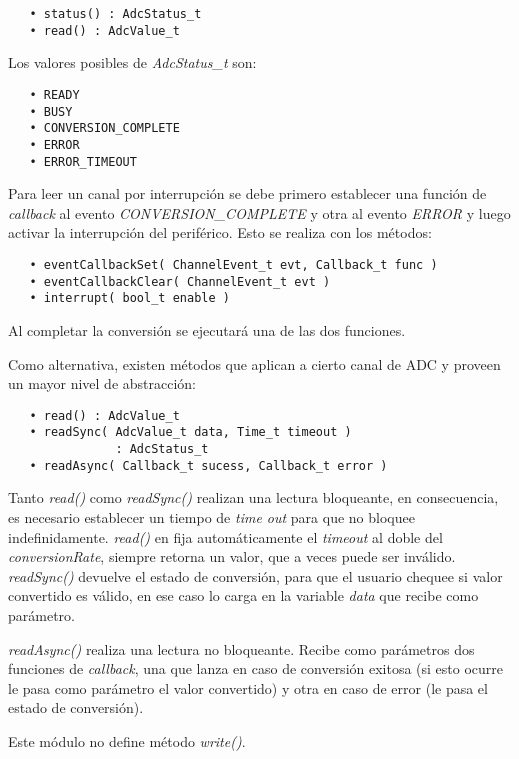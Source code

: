 \begin{verbatim}
   • status() : AdcStatus_t
   • read() : AdcValue_t
\end{verbatim}

Los valores posibles de \emph{AdcStatus\_t} son: 


\begin{verbatim}
   • READY
   • BUSY
   • CONVERSION_COMPLETE
   • ERROR
   • ERROR_TIMEOUT
\end{verbatim}

Para leer un canal por interrupción se debe primero establecer una función de \emph{callback} al evento \emph{CONVERSION\_COMPLETE} y otra al evento  \emph{ERROR} y luego activar la interrupción del periférico. Esto se realiza con los métodos:

\begin{verbatim}
   • eventCallbackSet( ChannelEvent_t evt, Callback_t func )
   • eventCallbackClear( ChannelEvent_t evt )
   • interrupt( bool_t enable )
\end{verbatim}

Al completar la conversión se ejecutará una de las dos funciones.


Como alternativa, existen métodos que aplican a cierto canal de ADC y proveen un mayor nivel de abstracción:

\begin{verbatim}
   • read() : AdcValue_t
   • readSync( AdcValue_t data, Time_t timeout )
               : AdcStatus_t
   • readAsync( Callback_t sucess, Callback_t error )
\end{verbatim}

Tanto \emph{read()} como \emph{readSync()} realizan una lectura bloqueante, en consecuencia, es necesario establecer un tiempo de \textit{time out} para que no bloquee indefinidamente. \emph{read()} en fija automáticamente el \emph{timeout} al doble del \emph{conversionRate}, siempre retorna un valor, que a veces puede ser inválido. \emph{readSync()} devuelve el estado de conversión, para que el usuario chequee si valor convertido es válido, en ese caso lo carga en la variable \emph{data} que recibe como parámetro.

\emph{readAsync()} realiza una lectura no bloqueante. Recibe como parámetros dos funciones de \emph{callback}, una que lanza en caso de conversión exitosa (si esto ocurre le pasa como parámetro el valor convertido) y otra en caso de error (le pasa el estado de conversión).

Este módulo no define método \emph{write()}.

